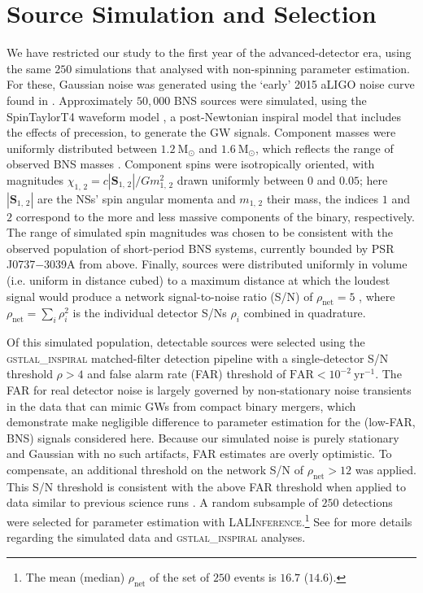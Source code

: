 \section{Source Simulation and Selection}\label{sec:sources}

We have restricted our study to the first year of the advanced-detector era, using the same $250$ simulations that \citet{Singer_2014} analysed with non-spinning parameter estimation. For these, Gaussian noise was generated using the `early' 2015 aLIGO noise curve found in \citet{Barsotti:2012}. Approximately $50,000$ BNS sources were simulated, using the SpinTaylorT4 waveform model \citep{Buonanno_2003,Buonanno_2009}, a post-Newtonian inspiral model that includes the effects of precession, to generate the GW signals. Component masses were uniformly distributed between $1.2~\mathrm{M}_\odot$ and $1.6~\mathrm{M}_\odot$, which reflects the range of observed BNS masses \citep{_zel_2012}. Component spins were isotropically oriented, with magnitudes $\chi_{1,\,2} = c |\mathbf{S}_{1,\,2}|/G m_{1,\,2}^2$ drawn uniformly between $0$ and $0.05$; here $|\mathbf{S}_{1,\,2}|$ are the NSs' spin angular momenta and $m_{1,\,2}$ their mass, the indices $1$ and $2$ correspond to the more and less massive components of the binary, respectively.  The range of simulated spin magnitudes was chosen to be consistent with the observed population of short-period BNS systems, currently bounded by PSR J0737$-$3039A \citep{Burgay_2003,Brown_2012} from above.  Finally, sources were distributed uniformly in volume (i.e. uniform in distance cubed) to a maximum distance at which the loudest signal would produce a network signal-to-noise ratio (S/N) of $\rho_\mathrm{net} = 5$ \citep{Singer_2014}, where $\rho_\mathrm{net} = \sum_i \rho_i^2$ is the individual detector S/Ns $\rho_i$ combined in quadrature.

Of this simulated population, detectable sources were selected using the \textsc{gstlal\_inspiral} matched-filter detection pipeline \citep{Cannon_2012} with a single-detector S/N threshold $\rho>4$ and false alarm rate (FAR) threshold of $\mathrm{FAR}<10^{-2}~\mathrm{yr}^{-1}$.  The FAR for real detector noise is largely governed by non-stationary noise transients in the data that can mimic GWs from compact binary mergers, which \citet{Berry_2014} demonstrate make negligible difference to parameter estimation for the (low-FAR, BNS) signals considered here.  Because our simulated noise is purely stationary and Gaussian with no such artifacts, FAR estimates are overly optimistic. To compensate, an additional threshold on the network S/N of $\rho_\mathrm{net} > 12$ was applied. This S/N threshold is consistent with the above FAR threshold when applied to data similar to previous science runs \citep{2013arXiv1304.0670L,Berry_2014}. A random subsample of $250$ detections were selected for parameter estimation with \textsc{LALInference}.\footnote{The mean (median) $\rho_\mathrm{net}$ of the set of $250$ events is $16.7$ ($14.6$).} See \citet{Singer_2014} for more details regarding the simulated data and \textsc{gstlal\_inspiral} analyses.